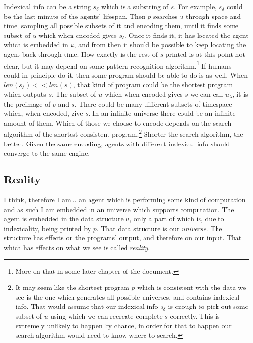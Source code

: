 Indexical info can be a string $s_\delta$ which is a substring of $s$.
For example, $s_\delta$ could be the last minute of the agents' lifespan.
Then $p$ searches $u$ through space and time, sampling all possible subsets of it and encoding them, until it finds some subset of $u$ which when encoded gives $s_\delta$.
Once it finds it, it has located the agent which is embedded in $u$, and from then it should be possible to keep locating the agent back through time.
How exactly is the rest of $s$ printed is at this point not clear, but it may depend on some pattern recognition algorithm.\footnote{More on that in some later chapter of the document.}
If humans could in principle do it, then some program should be able to do is as well.
When $len(s_\delta) << len(s)$, that kind of program could be the shortest program which outputs $s$.
The subset of $u$ which when encoded gives $s$ we can call $u_\lambda$, it is the preimage of $o$ and $s$.
There could be many different subsets of timespace which, when encoded, give $s$.
In an infinite universe there could be an infinite amount of them.
Which of those we choose to encode depends on the search algorithm of the shortest consistent program.\footnote{
It may seem like the shortest program $p$ which is consistent with the data we see is the one which generates all possible universes, and contains indexical info.
That would assume that our indexical info $s_\delta$ is enough to pick out some subset of $u$ using which we can recreate complete $s$ correctly.
This is extremely unlikely to happen by chance, in order for that to happen our search algorithm would need to know where to search.
}
Shorter the search algorithm, the better.
Given the same encoding, agents with different indexical info should converge to the same engine.

\newpage

\subsection{Reality}

I think, therefore I am...  an agent which is performing some kind of computation and as such I am embedded in an universe which supports computation.
The agent is embedded in the data structure $u$, only a part of which is, due to indexicality, being printed by $p$.
That data structure is our \textit{universe}.
The structure has effects on the programs' output, and therefore on our input.
That which has effects on what we see is called \textit{reality}.

